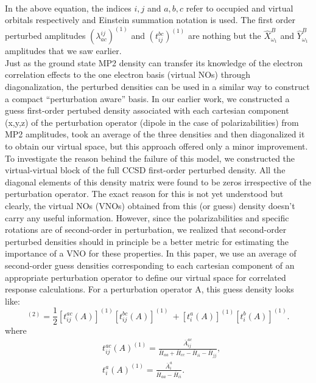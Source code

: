 \\
In the above equation, the indices $i,j$ and $a,b,c$ refer to occupied and virtual orbitals respectively
and Einstein summation notation is used. The first order perturbed amplitudes $(\lambda^{ij}_{ac})^{(1)}$ 
and $(t^{bc}_{ij})^{(1)}$ are nothing but the $\hat{X}^{B}_{\omega_1}$ and $\hat{Y}^{B}_{\omega_1}$ 
amplitudes that we saw earlier.\\ Just as the ground state MP2 density can transfer its knowledge of 
the electron correlation effects to the one electron basis (virtual NOs) through diagonalization, 
the perturbed densities can be used in a similar way to construct a compact ``perturbation aware''
basis. In our earlier work, we constructed a guess first-order pertubed density associated  
with each cartesian component (x,y,z) of the perturbation operator (dipole in the case of polarizabilities)
from MP2 amplitudes, took an average of the three densities and then diagonalized it to obtain our 
virtual space, but this approach offered only a minor improvement\cite{Kumar17}.
To investigate the reason behind the failure of this model, we constructed the virtual-virtual
block of the full CCSD first-order perturbed density. All the diagonal elements of this density 
matrix were found to be zeros irrespective of the perturbation operator. The exact reason for this
is not yet understood but clearly, the virtual NOs (VNOs) obtained from this (or guess) density 
doesn't carry any useful information. However, since the polarizabilities and specific rotations are 
of second-order in perturbation, we realized that second-order perturbed densities should in principle be a better 
metric for estimating the importance of a VNO for these properties.
In this paper, we use an average of second-order guess densities corresponding to each cartesian
component of an appropriate perturbation operator to define our virtual space 
for correlated response calculations. For a perturbation operator A, this guess density looks like:
\\
\begin{equation}
[{D^A_{ab}}]^{(2)} = \frac{1}{2}[t^{ac}_{ij}(A)]^{(1)}[t^{bc}_{ij}(A)]^{(1)} \
+ [t^{a}_{i}(A)]^{(1)} [t^{b}_{i}(A)]^{(1)}.
\end{equation}
where
\begin{equation}
\begin{split}
& t^{ac}_{ij}(A)^{(1)} = \frac{\bar{A}^{ac}_{ij}}{\overbar{H}_{aa} + \overbar{H}_{cc} - \overbar{H}_{ii} - \overbar{H}_{jj}},\\
& t^{a}_{i}(A)^{(1)} = \frac{\bar{A}^{a}_{i}}{\overbar{H}_{aa} - \overbar{H}_{ii}}.\\
\end{split}
\end{equation}
